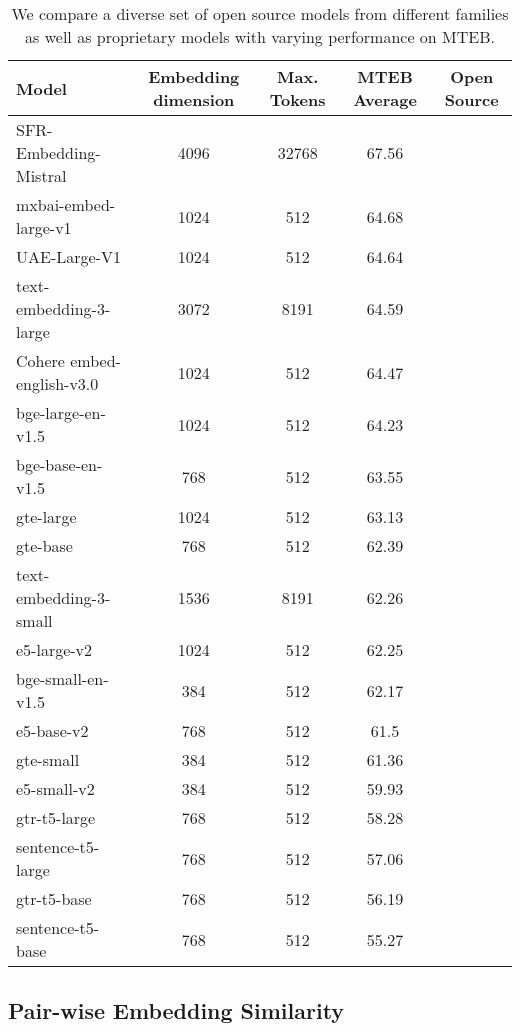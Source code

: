 \documentclass[nonacm,sigconf]{acmart}
\newcommand{\cmark}{\ding{51}}
\newcommand{\xmark}{\ding{55}}
\begin{document}
\begin{table*}[]
    \centering
    \caption{We compare a diverse set of open source models from different families as well as proprietary models with varying performance on MTEB.}
    \begin{tabular}{lcccc}
        \toprule
         Model & Embedding dimension & Max. Tokens & MTEB Average & Open Source \\
         \midrule
         SFR-Embedding-Mistral & 4096 & 32768 & 67.56 & \cmark \\
         mxbai-embed-large-v1 & 1024 & 512 & 64.68 & \cmark \\
         UAE-Large-V1 & 1024 & 512 & 64.64 & \cmark \\
         text-embedding-3-large & 3072 & 8191 & 64.59 & \xmark \\
         Cohere embed-english-v3.0 & 1024 & 512 & 64.47 & \xmark \\
         bge-large-en-v1.5 & 1024 & 512 & 64.23 & \cmark \\
         bge-base-en-v1.5  & 768 & 512 & 63.55 & \cmark \\
         gte-large & 1024 & 512 & 63.13 & \cmark \\
         gte-base & 768 & 512 & 62.39 & \cmark \\
         text-embedding-3-small & 1536 & 8191 & 62.26 & \xmark \\
         e5-large-v2 & 1024 & 512 & 62.25 & \cmark \\
         bge-small-en-v1.5 & 384 & 512 & 62.17 & \cmark \\
         e5-base-v2 & 768 & 512 & 61.5 & \cmark \\
         gte-small & 384 & 512 & 61.36 & \cmark \\
         e5-small-v2 & 384 & 512 & 59.93 & \cmark \\
         gtr-t5-large & 768 & 512 & 58.28 & \cmark \\
         sentence-t5-large & 768 & 512 & 57.06 & \cmark \\
         gtr-t5-base & 768 & 512 & 56.19 & \cmark \\
         sentence-t5-base & 768 & 512 & 55.27 & \cmark \\
         \bottomrule
    \end{tabular}
    \label{tab:models}
\end{table*}

\subsection{Pair-wise Embedding Similarity}
\end{document}
